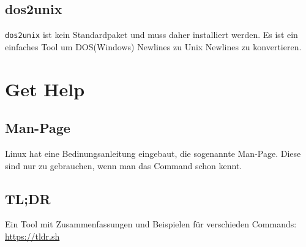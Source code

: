 \documentclass{article}
\begin{document}
\subsection{dos2unix}
\texttt{dos2unix} ist kein Standardpaket und muss daher installiert werden.
Es ist ein einfaches Tool um DOS(Windows) Newlines zu Unix Newlines zu konvertieren. 

\section{Get Help}
\subsection{Man-Page}
Linux hat eine Bedinungsanleitung eingebaut, die sogenannte Man-Page.
Diese sind nur zu gebrauchen, wenn man das Command schon kennt.

\subsection{TL;DR}
Ein Tool mit Zusammenfassungen und Beispielen für verschieden Commands: \href{https://tldr.sh/}{https://tldr.sh}
\end{document}
